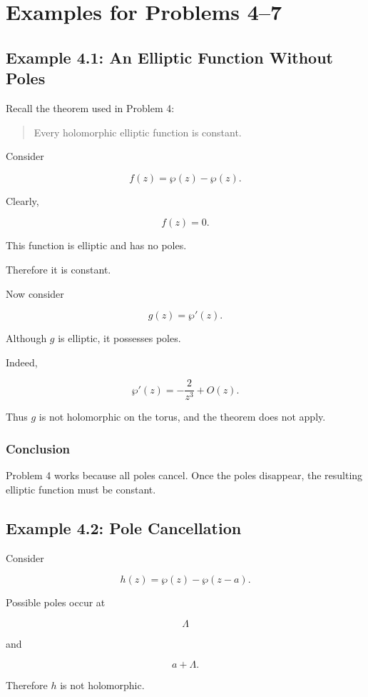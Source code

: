 \documentclass[12pt,a4paper]{article}
\theoremstyle{notespace}
\begin{document}
\section{Examples for Problems 4--7}

\subsection{Example 4.1: An Elliptic Function Without Poles}

Recall the theorem used in Problem 4:

\begin{quote}
	Every holomorphic elliptic function is constant.
\end{quote}

Consider

\[
f(z)=\wp(z)-\wp(z).
\]

Clearly,

\[
f(z)=0.
\]

This function is elliptic and has no poles.

Therefore it is constant.

Now consider

\[
g(z)=\wp'(z).
\]

Although \(g\) is elliptic, it possesses poles.

Indeed,

\[
\wp'(z)
=
-\frac{2}{z^3}
+
O(z).
\]

Thus \(g\) is not holomorphic on the torus, and the theorem does not apply.

\subsubsection*{Conclusion}

Problem 4 works because all poles cancel. Once the poles disappear, the resulting elliptic function must be constant.

\subsection{Example 4.2: Pole Cancellation}

Consider

\[
h(z)
=
\wp(z)-\wp(z-a).
\]

Possible poles occur at

\[
\Lambda
\]

and

\[
a+\Lambda.
\]

Therefore \(h\) is not holomorphic.
\end{document}
